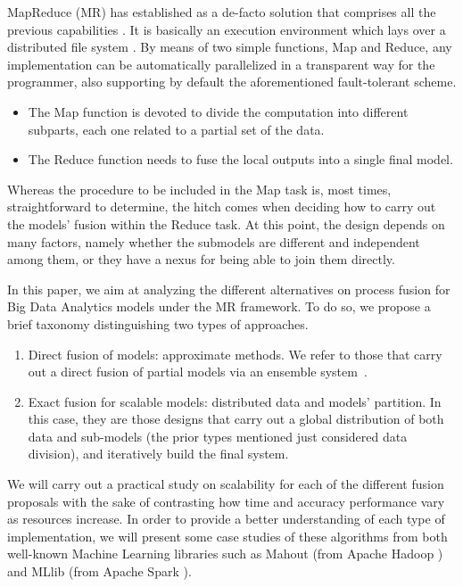 \documentclass[3p,review]{elsarticle}
\begin{document}
	MapReduce (MR) has established as a de-facto solution that comprises all the previous capabilities \cite{Dea08,Dean10,Lee11-MR}. It is basically an execution environment which lays over a distributed file system \cite{Shvachko10-HDFS}. By means of two simple functions, Map and Reduce, any implementation can be automatically parallelized in a transparent way for the programmer, also supporting by default the aforementioned fault-tolerant scheme.
	\begin{itemize}
		\item The Map function is devoted to divide the computation into different subparts, each one related to a partial set of the data.
		\item The Reduce function needs to fuse the local outputs into a single final model.
	\end{itemize}
	
	Whereas the procedure to be included in the Map task is, most times, straightforward to determine, the hitch comes when deciding how to carry out the models' fusion within the Reduce task. At this point, the design depends on many factors, namely whether the submodels are different and independent among them, or they have a nexus for being able to join them directly. 
	
	In this paper, we aim at analyzing the different alternatives on process fusion  for Big Data Analytics models under the MR framework. To do so, we propose a brief taxonomy distinguishing two types of approaches. 
	\begin{enumerate}
		\item Direct fusion of models: approximate methods. We refer to those that carry out a direct fusion of partial models via an ensemble system~\cite{krawczyk17}.
		\item Exact fusion for scalable models: distributed data and models' partition. In this case, they are those designs that carry out a global distribution of both data and sub-models (the prior types mentioned just considered data division), and iteratively build the final system.
	\end{enumerate}
	
	
	We will carry out a practical study on scalability for each of the different fusion proposals with the sake of contrasting how time and accuracy performance vary as resources increase. In order to provide a better understanding of each type of implementation, we will present some case studies of these algorithms from both well-known Machine Learning libraries such as Mahout \cite{Owe11,Mahout17,Mahout16-Book} (from Apache Hadoop \cite{Lam11,Whi15-Hadoop}) and MLlib \cite{mllib15} (from Apache Spark \cite{Zaharia10,zaharia12}). 
	
\end{document}
